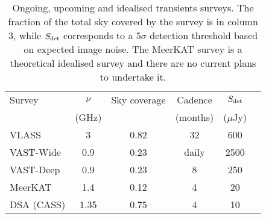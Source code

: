 \begin{table}
    \caption[Radio transient survey specifications]{Ongoing, upcoming and idealised transients surveys. The fraction of the total sky covered by the survey is in column 3, while $S_{\rm det}$ corresponds to a $5\sigma$ detection threshold based on expected image noise. The MeerKAT survey is a theoretical idealised survey and there are no current plans to undertake it.}
    \label{tab:transient_surveys}
    \centering
    \begin{tabular}{lccccc}
    \hline\hline
    Survey & $\nu$ & Sky coverage & Cadence & $S_{\rm det}$\\
     & (GHz) & & (months) & ($\mu$Jy)\\
    \hline
    VLASS & 3 & 0.82 & 32 & 600\\
    \rule{0pt}{3ex}VAST-Wide & 0.9 & 0.23 & daily & 2500\\
    VAST-Deep & 0.9 & 0.23 & 8 & 250\\
    \rule{0pt}{3ex}MeerKAT & 1.4 & 0.12 & 4 & 20\\
    DSA (CASS) & 1.35 & 0.75 & 4 & 10\\
    \hline\hline
    \end{tabular}
\end{table}